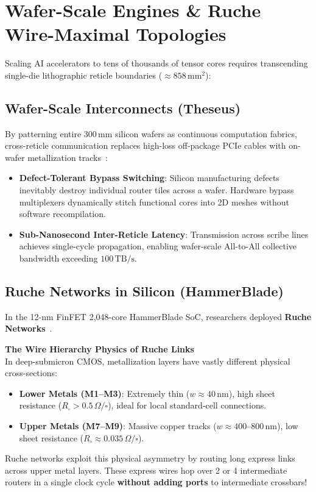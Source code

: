 \section{Wafer-Scale Engines \& Ruche Wire-Maximal Topologies}
\label{sec:wafer-scale-ruche}

Scaling AI accelerators to tens of thousands of tensor cores requires transcending single-die lithographic reticle boundaries ($\approx 858\,\mathrm{mm}^2$):

\subsection{Wafer-Scale Interconnects (Theseus)}
By patterning entire $300\,\mathrm{mm}$ silicon wafers as continuous computation fabrics, cross-reticle communication replaces high-loss off-package PCIe cables with on-wafer metallization tracks~\cite{Zhu2025}:
\begin{itemize}
    \item \textbf{Defect-Tolerant Bypass Switching}: Silicon manufacturing defects inevitably destroy individual router tiles across a wafer. Hardware bypass multiplexers dynamically stitch functional cores into 2D meshes without software recompilation.
    \item \textbf{Sub-Nanosecond Inter-Reticle Latency}: Transmission across scribe lines achieves single-cycle propagation, enabling wafer-scale All-to-All collective bandwidth exceeding $100\,\mathrm{TB/s}$.
\end{itemize}

\subsection{Ruche Networks in Silicon (HammerBlade)}
In the 12-nm FinFET 2,048-core HammerBlade SoC, researchers deployed \textbf{Ruche Networks}~\cite{Gao2026}. 

\begin{svgraybox}
\textbf{The Wire Hierarchy Physics of Ruche Links} \\
In deep-submicron CMOS, metallization layers have vastly different physical cross-sections:
\begin{itemize}
    \item \textbf{Lower Metals (M1--M3)}: Extremely thin ($w \approx 40\,\mathrm{nm}$), high sheet resistance ($R_{\square} > 0.5\,\Omega/\square$), ideal for local standard-cell connections.
    \item \textbf{Upper Metals (M7--M9)}: Massive copper tracks ($w \approx 400\text{--}800\,\mathrm{nm}$), low sheet resistance ($R_{\square} \approx 0.035\,\Omega/\square$).
\end{itemize}
Ruche networks exploit this physical asymmetry by routing long express links across upper metal layers. These express wires hop over 2 or 4 intermediate routers in a single clock cycle \textbf{without adding ports} to intermediate crossbars!
\end{svgraybox}

